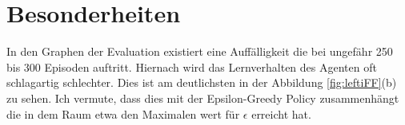 \section{Besonderheiten}
In den Graphen der Evaluation existiert eine Auffälligkeit die bei ungefähr 250 bis 300 Episoden auftritt. Hiernach wird das Lernverhalten des Agenten oft schlagartig schlechter. Dies ist am deutlichsten in der Abbildung \ref{fig:leftiFF}(b) zu sehen. Ich vermute, dass dies mit der Epsilon-Greedy Policy zusammenhängt die in dem Raum etwa den Maximalen wert für $\epsilon$ erreicht hat.





